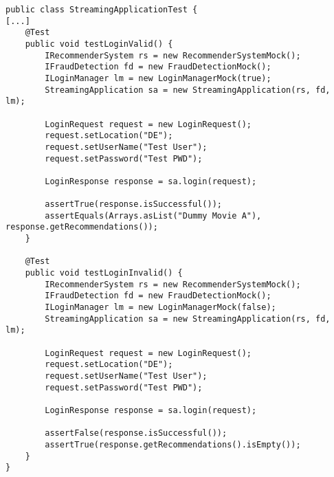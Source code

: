 \begin{lstlisting}[style=javastyle, caption={Unittests für login() (Failen, Methode wird in 2.4 angepasst)}]
public class StreamingApplicationTest {
[...]
    @Test
    public void testLoginValid() {
        IRecommenderSystem rs = new RecommenderSystemMock();
        IFraudDetection fd = new FraudDetectionMock();
        ILoginManager lm = new LoginManagerMock(true);
        StreamingApplication sa = new StreamingApplication(rs, fd, lm);
    
        LoginRequest request = new LoginRequest();
        request.setLocation("DE");
        request.setUserName("Test User");
        request.setPassword("Test PWD");
    
        LoginResponse response = sa.login(request);
    
        assertTrue(response.isSuccessful());
        assertEquals(Arrays.asList("Dummy Movie A"), response.getRecommendations());
    }
    
    @Test
    public void testLoginInvalid() {
        IRecommenderSystem rs = new RecommenderSystemMock();
        IFraudDetection fd = new FraudDetectionMock();
        ILoginManager lm = new LoginManagerMock(false);
        StreamingApplication sa = new StreamingApplication(rs, fd, lm);
    
        LoginRequest request = new LoginRequest();
        request.setLocation("DE");
        request.setUserName("Test User");
        request.setPassword("Test PWD");
    
        LoginResponse response = sa.login(request);
    
        assertFalse(response.isSuccessful());
        assertTrue(response.getRecommendations().isEmpty());
    }
}
\end{lstlisting}